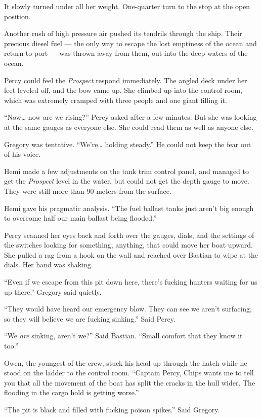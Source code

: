\documentclass[]{article}
\begin{document}
\begin{multicols}{2}
It slowly turned under all her weight. One-quarter turn to the stop at
the open position.

Another rush of high pressure air pushed its tendrils through the ship.
Their precious diesel fuel --- the only way to escape the lost emptiness
of the ocean and return to port --- was thrown away from them, out into
the deep waters of the ocean.

Percy could feel the \emph{Prospect} respond immediately. The angled
deck under her feet leveled off, and the bow came up. She climbed up
into the control room, which was extremely cramped with three people and
one giant filling it.

``Now\ldots{} now are we rising?'' Percy asked after a few minutes. But
she was looking at the same gauges as everyone else. She could read them
as well as anyone else.

Gregory was tentative. ``We're\ldots{} holding steady.'' He could not
keep the fear out of his voice.

Hemi made a few adjustments on the tank trim control panel, and managed
to get the \emph{Prospect} level in the water, but could not get the
depth gauge to move. They were still more than 90 meters from the
surface.

Hemi gave his pragmatic analysis. ``The fuel ballast tanks just aren't
big enough to overcome half our main ballast being flooded.''

Percy scanned her eyes back and forth over the gauges, dials, and the
settings of the switches looking for something, anything, that could
move her boat upward. She pulled a rag from a hook on the wall and
reached over Bastian to wipe at the dials. Her hand was shaking.

``Even if we escape from this pit down here, there's fucking hunters
waiting for us up there.'' Gregory said quietly.

``They would have heard our emergency blow. They can see we aren't
surfacing, so they will believe we are fucking sinking.'' Said Percy.

``We \emph{are} sinking, aren't we?'' Said Bastian. ``Small comfort that
they know it too.''

Owen, the youngest of the crew, stuck his head up through the hatch
while he stood on the ladder to the control room. ``Captain Percy, Chips
wants me to tell you that all the movement of the boat has split the
cracks in the hull wider. The flooding in the cargo hold is getting
worse.''

``The pit is black and filled with fucking poison spikes.'' Said
Gregory.


\end{multicols}
\end{document}
